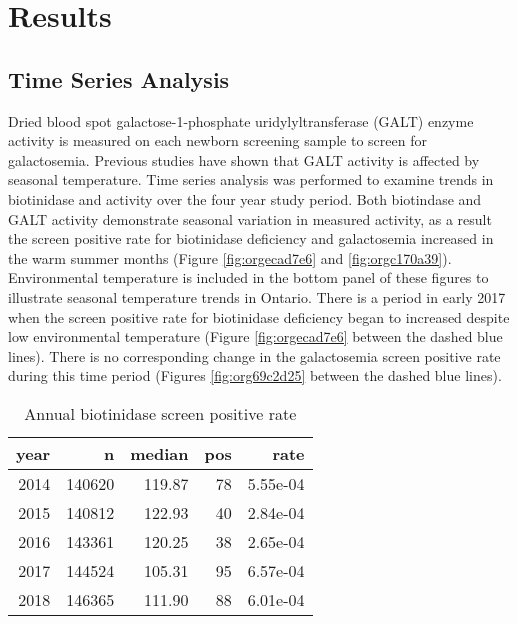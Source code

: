 \documentclass[review]{elsarticle}
\begin{document}
\section*{Results}
\label{sec:orgbc1f4f8}
\subsection*{Time Series Analysis}
\label{sec:org114cfe8}
Dried blood spot galactose-1-phosphate uridylyltransferase (GALT)
enzyme activity is measured on each newborn screening sample to screen
for galactosemia. Previous studies have shown that GALT activity is
affected by seasonal temperature. Time series analysis was performed
to examine trends in biotinidase and activity over the four year study
period. Both biotindase and GALT activity demonstrate seasonal
variation in measured activity, as a result the screen positive rate
for biotinidase deficiency and galactosemia increased in the warm
summer months (Figure \ref{fig:orgecad7e6} and \ref{fig:orgc170a39}). Environmental
temperature is included in the bottom panel of these figures to
illustrate seasonal temperature trends in Ontario. There is a period
in early 2017 when the screen positive rate for biotinidase deficiency
began to increased despite low environmental temperature (Figure
\ref{fig:orgecad7e6} between the dashed blue lines). There is no corresponding
change in the galactosemia screen positive rate during this time
period (Figures \ref{fig:org69c2d25} between the dashed blue lines).

\begin{table}[ht]
\centering
\begin{tabular}{rrrrr}
  \hline
year & n & median & pos & rate \\ 
  \hline
2014 & 140620 & 119.87 &  78 & 5.55e-04 \\ 
  2015 & 140812 & 122.93 &  40 & 2.84e-04 \\ 
  2016 & 143361 & 120.25 &  38 & 2.65e-04 \\ 
  2017 & 144524 & 105.31 &  95 & 6.57e-04 \\ 
  2018 & 146365 & 111.90 &  88 & 6.01e-04 \\ 
   \hline
\end{tabular}
\caption{Annual biotinidase screen positive rate} 
\label{tab:biot_year}
\end{table}
\end{document}
